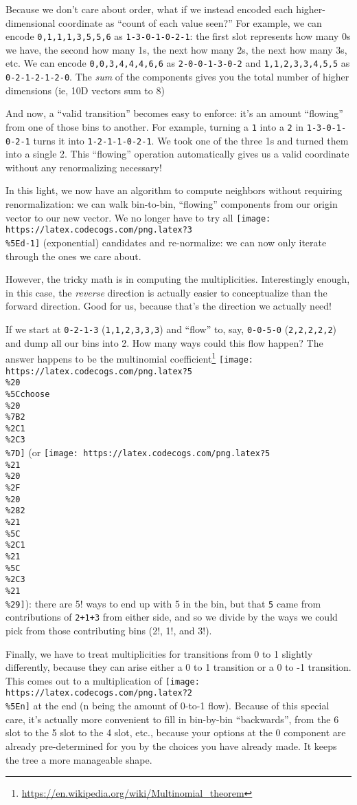 \documentclass[]{article}
\renewcommand{\href}[2]{#2\footnote{\url{#1}}}
\begin{document}
Because we don't care about order, what if we instead encoded each
higher-dimensional coordinate as ``count of each value seen?'' For example, we
can encode \texttt{0,1,1,1,3,5,5,6} as \texttt{1-3-0-1-0-2-1}: the first slot
represents how many 0s we have, the second how many 1s, the next how many 2s,
the next how many 3s, etc. We can encode \texttt{0,0,3,4,4,4,6,6} as
\texttt{2-0-0-1-3-0-2} and \texttt{1,1,2,3,3,4,5,5} as \texttt{0-2-1-2-1-2-0}.
The \emph{sum} of the components gives you the total number of higher dimensions
(ie, 10D vectors sum to 8)

And now, a ``valid transition'' becomes easy to enforce: it's an amount
``flowing'' from one of those bins to another. For example, turning a \texttt{1}
into a \texttt{2} in \texttt{1-3-0-1-0-2-1} turns it into
\texttt{1-2-1-1-0-2-1}. We took one of the three 1s and turned them into a
single 2. This ``flowing'' operation automatically gives us a valid coordinate
without any renormalizing necessary!

In this light, we now have an algorithm to compute neighbors without requiring
renormalization: we can walk bin-to-bin, ``flowing'' components from our origin
vector to our new vector. We no longer have to try all
\texttt{[image: https://latex.codecogs.com/png.latex?3\\\%5Ed-1]} (exponential)
candidates and re-normalize: we can now only iterate through the ones we care
about.

However, the tricky math is in computing the multiplicities. Interestingly
enough, in this case, the \emph{reverse} direction is actually easier to
conceptualize than the forward direction. Good for us, because that's the
direction we actually need!

If we start at \texttt{0-2-1-3} (\texttt{1,1,2,3,3,3}) and ``flow'' to, say,
\texttt{0-0-5-0} (\texttt{2,2,2,2,2}) and dump all our bins into 2. How many
ways could this flow happen? The answer happens to be the
\href{https://en.wikipedia.org/wiki/Multinomial_theorem}{multinomial
coefficient}
\texttt{[image: https://latex.codecogs.com/png.latex?5\\\%20\\\%5Cchoose\\\%20\\\%7B2\\\%2C1\\\%2C3\\\%7D]}
(or
\texttt{[image: https://latex.codecogs.com/png.latex?5\\\%21\\\%20\\\%2F\\\%20\\\%282\\\%21\\\%5C\\\%2C1\\\%21\\\%5C\\\%2C3\\\%21\\\%29]}):
there are 5! ways to end up with 5 in the bin, but that \texttt{5} came from
contributions of \texttt{2+1+3} from either side, and so we divide by the ways
we could pick from those contributing bins (2!, 1!, and 3!).

Finally, we have to treat multiplicities for transitions from 0 to 1 slightly
differently, because they can arise either a 0 to 1 transition or a 0 to -1
transition. This comes out to a multiplication of
\texttt{[image: https://latex.codecogs.com/png.latex?2\\\%5En]} at the end (n
being the amount of 0-to-1 flow). Because of this special care, it's actually
more convenient to fill in bin-by-bin ``backwards'', from the 6 slot to the 5
slot to the 4 slot, etc., because your options at the 0 component are already
pre-determined for you by the choices you have already made. It keeps the tree a
more manageable shape.
\end{document}
